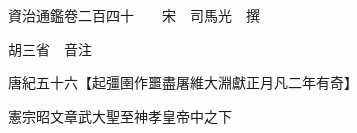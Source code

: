 










 


 
 


 

  
  
  
  
  





  
  
  
  
  
 
  

  

  
  
  



  

 
 

  
   




  

  
  


  　　資治通鑑卷二百四十　　宋　司馬光　撰

　　胡三省　音注

　　唐紀五十六【起彊圉作噩盡屠維大淵獻正月凡二年有奇】

　　憲宗昭文章武大聖至神孝皇帝中之下

